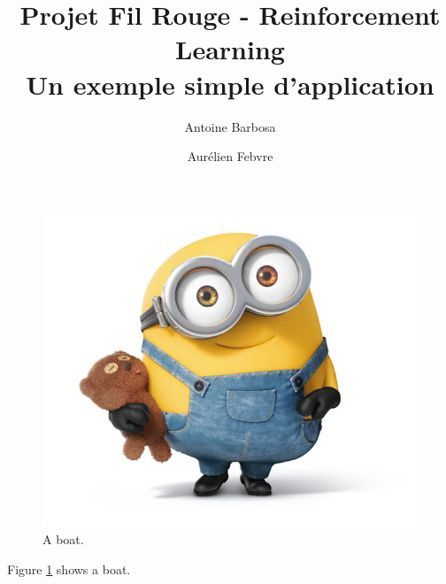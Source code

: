 \documentclass[a4paper]{article}
\title{Projet Fil Rouge - Reinforcement Learning\\Un exemple simple
d'application}           %
\author{Antoine Barbosa \and Aurélien Febvre}
\date{}                       %
\begin{document}
\maketitle                    %

\begin{figure}
  \includegraphics[width=\linewidth]{bob1.jpg}
  \caption{A boat.}
  \label{fig:boat1}
\end{figure}

Figure \ref{fig:boat1} shows a boat.
\end{document}
